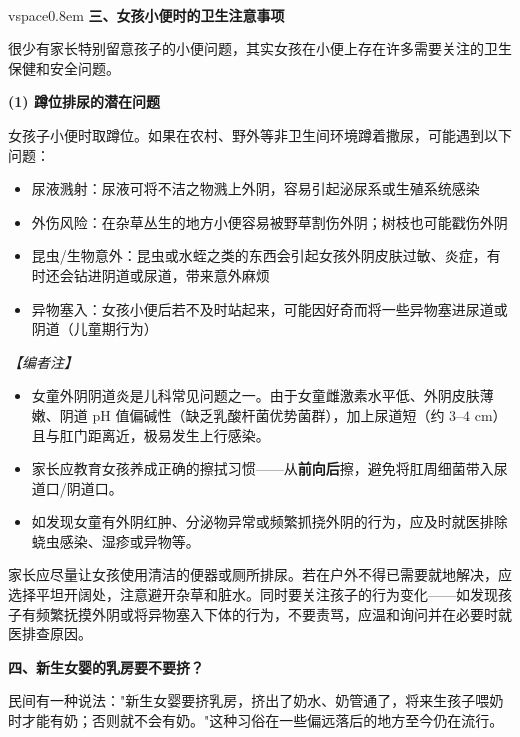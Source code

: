 \begin{enumerate}
\\vspace{0.8em}
\noindent\textbf{三、女孩小便时的卫生注意事项}

很少有家长特别留意孩子的小便问题，其实女孩在小便上存在许多需要关注的卫生保健和安全问题。

\vspace{0.5em}
\noindent\textbf{(1) 蹲位排尿的潜在问题}

女孩子小便时取蹲位。如果在农村、野外等非卫生间环境蹲着撒尿，可能遇到以下问题：
\begin{itemize}
	\item 尿液溅射：尿液可将不洁之物溅上外阴，容易引起泌尿系或生殖系统感染
	\item 外伤风险：在杂草丛生的地方小便容易被野草割伤外阴；树枝也可能戳伤外阴
	\item 昆虫/生物意外：昆虫或水蛭之类的东西会引起女孩外阴皮肤过敏、炎症，有时还会钻进阴道或尿道，带来意外麻烦
	\item 异物塞入：女孩小便后若不及时站起来，可能因好奇而将一些异物塞进尿道或阴道（儿童期行为）
\end{itemize}

\vspace{0.3em}
\noindent\textit{【编者注】}
\begin{itemize}
	\item 女童外阴阴道炎是儿科常见问题之一。由于女童雌激素水平低、外阴皮肤薄嫩、阴道 pH 值偏碱性（缺乏乳酸杆菌优势菌群），加上尿道短（约 $3$--$4$ cm）且与肛门距离近，极易发生上行感染。
	\item 家长应教育女孩养成正确的擦拭习惯——从\textbf{前向后}擦，避免将肛周细菌带入尿道口/阴道口。
	\item 如发现女童有外阴红肿、分泌物异常或频繁抓挠外阴的行为，应及时就医排除蛲虫感染、湿疹或异物等。
\end{itemize}

\begin{tcolorbox}[colback=pink!5!white,colframe=red!50!black,title=贴心小叮咛]
家长应尽量让女孩使用清洁的便器或厕所排尿。若在户外不得已需要就地解决，应选择平坦开阔处，注意避开杂草和脏水。同时要关注孩子的行为变化——如发现孩子有频繁抚摸外阴或将异物塞入下体的行为，不要责骂，应温和询问并在必要时就医排查原因。
\end{tcolorbox}

\vspace{0.8em}
\noindent\textbf{四、新生女婴的乳房要不要挤？}

民间有一种说法："新生女婴要挤乳房，挤出了奶水、奶管通了，将来生孩子喂奶时才能有奶；否则就不会有奶。"这种习俗在一些偏远落后的地方至今仍在流行。


\end{enumerate}
